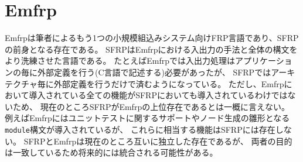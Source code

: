 \section{Emfrp}
Emfrp\cite{sawada2016emfrp}は筆者によるもう1つの小規模組込みシステム向けFRP言語であり、SFRPの前身となる存在である。
SFRPはEmfrpにおける入出力の手法と全体の構文をより洗練させた言語である。
たとえばEmfrpでは入出力処理はアプリケーションの毎に外部定義を行う(C言語で記述する)必要があったが、
SFRPではアーキテクチャ毎に外部定義を行うだけで済むようになっている。
ただし、Emfrpにおいて導入されている全ての機能がSFRPにおいても導入されているわけではないため、
現在のところSFRPがEmfrpの上位存在であるとは一概に言えない。
例えばEmfrpにはユニットテストに関するサポートやノード生成の雛形となる\texttt{module}構文が導入されているが、
これらに相当する機能はSFRPには存在しない。
SFRPとEmfrpは現在のところ互いに独立した存在であるが、
両者の目的は一致しているため将来的には統合される可能性がある。

